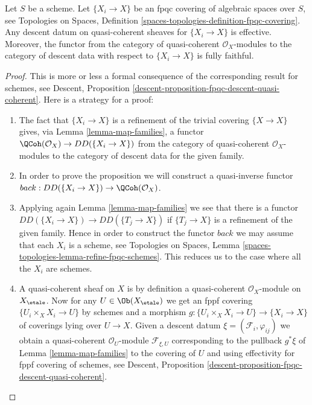 \begin{proposition}
\label{proposition-fpqc-descent-quasi-coherent}
Let $S$ be a scheme.
Let $\{X_i \to X\}$ be an fpqc covering of algebraic spaces over $S$, see
Topologies on Spaces,
Definition \ref{spaces-topologies-definition-fpqc-covering}.
Any descent datum on quasi-coherent sheaves
for $\{X_i \to X\}$ is effective.
Moreover, the functor from the category of
quasi-coherent $\mathcal{O}_X$-modules to the category
of descent data with respect to $\{X_i \to X\}$ is fully faithful.
\end{proposition}

\begin{proof}
This is more or less a formal consequence of
the corresponding result for schemes, see
Descent, Proposition \ref{descent-proposition-fpqc-descent-quasi-coherent}.
Here is a strategy for a proof:
\begin{enumerate}
\item The fact that $\{X_i \to X\}$ is a refinement of the trivial
covering $\{X \to X\}$ gives, via
Lemma \ref{lemma-map-families},
a functor $\QCoh(\mathcal{O}_X) \to DD(\{X_i \to X\})$ from the
category of quasi-coherent $\mathcal{O}_X$-modules to the category of
descent data for the given family.
\item In order to prove the proposition we will construct a
quasi-inverse functor
$back : DD(\{X_i \to X\}) \to \QCoh(\mathcal{O}_X)$.
\item Applying again
Lemma \ref{lemma-map-families}
we see that there is a functor
$DD(\{X_i \to X\}) \to DD(\{T_j \to X\})$
if $\{T_j \to X\}$ is a refinement of the given family.
Hence in order to construct the functor $back$ we may assume that
each $X_i$ is a scheme, see
Topologies on Spaces,
Lemma \ref{spaces-topologies-lemma-refine-fpqc-schemes}.
This reduces us to the case where all the $X_i$ are schemes.
\item A quasi-coherent sheaf on $X$ is by definition a quasi-coherent
$\mathcal{O}_X$-module on $X_\etale$. Now for any
$U \in \Ob(X_\etale)$ we get an fppf covering
$\{U_i \times_X X_i \to U\}$ by schemes and a morphism
$g : \{U_i \times_X X_i \to U\} \to \{X_i \to X\}$ of coverings
lying over $U \to X$. Given a descent datum
$\xi = (\mathcal{F}_i, \varphi_{ij})$ we obtain a quasi-coherent
$\mathcal{O}_U$-module $\mathcal{F}_{\xi, U}$ corresponding
to the pullback $g^*\xi$ of
Lemma \ref{lemma-map-families}
to the covering of $U$ and using effectivity for fppf covering of schemes, see
Descent, Proposition \ref{descent-proposition-fpqc-descent-quasi-coherent}.

\end{enumerate}
\end{proof}

